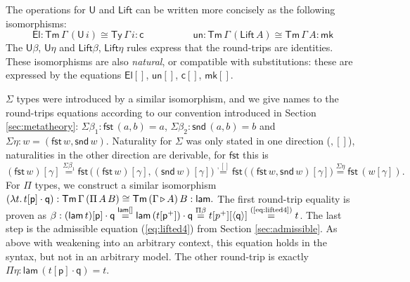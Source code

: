 \documentclass[submission,copyright,creativecommons]{eptcs}
\newcommand{\Ty}{\mathsf{Ty}}
\newcommand{\Tm}{\mathsf{Tm}}
\newcommand{\p}{\mathsf{p}}
\newcommand{\q}{\mathsf{q}}
\newcommand{\ext}{\mathop{\triangleright}}
\newcommand{\lam}{\mathsf{lam}}
\newcommand{\U}{\mathsf{U}}
\newcommand{\El}{\mathsf{El}}
\newcommand{\cd}{\mathsf{c}}
\newcommand{\fst}{\mathsf{fst}}
\newcommand{\snd}{\mathsf{snd}}
\newcommand{\Lift}{\mathsf{Lift}}
\newcommand{\mk}{\mathsf{mk}}
\newcommand{\un}{\mathsf{un}}
\begin{document}
The operations for $\U$ and $\Lift$ can be written more concisely as
the following isomorphisms:
\[
\El:\Tm\,\Gamma\,(\U\,i) \cong \Ty\,\Gamma\,i:\cd \hspace{5em} \un:\Tm\,\Gamma\,(\Lift\,A)\cong\Tm\,\Gamma\,A:\mk
\]
The $\U\beta$, $\U\eta$ and $\Lift\beta$, $\Lift\eta$ rules express
that the round-trips are identities. These isomorphisms are also
\emph{natural}, or compatible with substitutions: these are expressed
by the equations $\El[]$, $\un[]$, $\cd[]$, $\mk[]$.

$\Sigma$ types were introduced by a similar isomorphism, and we give
names to the round-trips equations according to our convention introduced in
Section \ref{sec:metatheory}: $\Sigma\beta_1 : \fst\,(a,b) = a$,
$\Sigma\beta_2 : \snd\,(a,b) = b$ and $\Sigma\eta : w =
(\fst\,w,\snd\,w)$. Naturality for $\Sigma$ was only stated in one
direction (${,}[]$), naturalities in the other direction are
derivable, for $\fst$ this is
$
(\fst\,w)[\gamma]  \overset{\Sigma\beta_1}{=}                          
\fst\,\big((\fst\,w)[\gamma],(\snd\,w)[\gamma]\big) \overset{{,}[]}{=} 
\fst\,\big((\fst\,w,\snd\,w)[\gamma]\big)  \overset{\Sigma\eta}=        
\fst\,(w[\gamma]).
$
For $\Pi$ types, we construct a similar isomorphism
$
(\lambda t\ldotp t[\p]\cdot\q) : \Tm\,\Gamma\,(\Pi\,A\,B) \cong \Tm\,(\Gamma\ext A)\,B : \lam.
$
The first round-trip equality is proven as
$\beta : (\lam\,t)[\p]\cdot\q \overset{\lam[]}{=} \lam\,(t[\p^+])\cdot\q \overset{\Pi\beta}{=} t[p^+][\langle\q\rangle] \overset{\text{(\ref{eq:lifted4})}}{=} t$.
The last step is the admissible equation (\ref{eq:lifted4}) from
Section \ref{sec:admissible}. As above with weakening into an
arbitrary context, this equation holds in the syntax, but not in an
arbitrary model.
The other round-trip is exactly $\Pi\eta : \lam\,(t[\p]\cdot\q) = t$.
\end{document}
